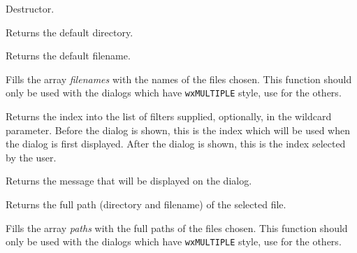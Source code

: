 

Destructor.

\label{wxfiledialoggetdirectory}


Returns the default directory.

\label{wxfiledialoggetfilename}


Returns the default filename.

\label{wxfiledialoggetfilenames}


Fills the array {\it filenames} with the names of the files chosen. This
function should only be used with the dialogs which have {\tt wxMULTIPLE} style,
use  for the others.

\label{wxfiledialoggetfilterindex}


Returns the index into the list of filters supplied, optionally, in the wildcard parameter.
Before the dialog is shown, this is the index which will be used when the dialog is first displayed.
After the dialog is shown, this is the index selected by the user.

\label{wxfiledialoggetmessage}


Returns the message that will be displayed on the dialog.

\label{wxfiledialoggetpath}


Returns the full path (directory and filename) of the selected file.

\label{wxfiledialoggetpaths}


Fills the array {\it paths} with the full paths of the files chosen. This
function should only be used with the dialogs which have {\tt wxMULTIPLE} style,
use  for the others.

